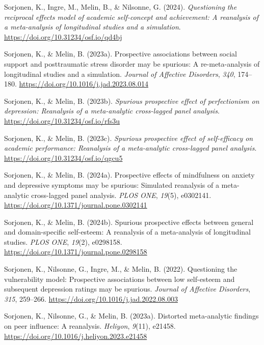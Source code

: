 \documentclass[
  man,floatsintext]{apa6}
\newlength{\cslhangindent}
\newenvironment{CSLReferences}[2] %
 {\begin{list}{}{%
  \setlength{\itemindent}{0pt}
  \setlength{\leftmargin}{0pt}
  \setlength{\parsep}{0pt}
  \ifodd #1
   \setlength{\leftmargin}{\cslhangindent}
   \setlength{\itemindent}{-1\cslhangindent}
  \fi
  \setlength{\itemsep}{#2\baselineskip}}}
 {\end{list}}
\begin{document}
\begin{CSLReferences}{1}{0}
Sorjonen, K., Ingre, M., Melin, B., \& Nilsonne, G. (2024). \emph{Questioning the reciprocal effects model of academic self-concept and achievement: {A} reanalysis of a meta-analysis of longitudinal studies and a simulation}. \url{https://doi.org/10.31234/osf.io/qd4bj}

Sorjonen, K., \& Melin, B. (2023a). Prospective associations between social support and posttraumatic stress disorder may be spurious: {A} re-meta-analysis of longitudinal studies and a simulation. \emph{Journal of Affective Disorders}, \emph{340}, 174--180. \url{https://doi.org/10.1016/j.jad.2023.08.014}

Sorjonen, K., \& Melin, B. (2023b). \emph{Spurious prospective effect of perfectionism on depression: {Reanalysis} of a meta-analytic cross-lagged panel analysis}. \url{https://doi.org/10.31234/osf.io/rfs3u}

Sorjonen, K., \& Melin, B. (2023c). \emph{Spurious prospective effect of self-efficacy on academic performance: {Reanalysis} of a meta-analytic cross-lagged panel analysis}. \url{https://doi.org/10.31234/osf.io/qgcu5}

Sorjonen, K., \& Melin, B. (2024a). Prospective effects of mindfulness on anxiety and depressive symptoms may be spurious: {Simulated} reanalysis of a meta-analytic cross-lagged panel analysis. \emph{PLOS ONE}, \emph{19}(5), e0302141. \url{https://doi.org/10.1371/journal.pone.0302141}

Sorjonen, K., \& Melin, B. (2024b). Spurious prospective effects between general and domain-specific self-esteem: {A} reanalysis of a meta-analysis of longitudinal studies. \emph{PLOS ONE}, \emph{19}(2), e0298158. \url{https://doi.org/10.1371/journal.pone.0298158}

Sorjonen, K., Nilsonne, G., Ingre, M., \& Melin, B. (2022). Questioning the vulnerability model: {Prospective} associations between low self-esteem and subsequent depression ratings may be spurious. \emph{Journal of Affective Disorders}, \emph{315}, 259--266. \url{https://doi.org/10.1016/j.jad.2022.08.003}

Sorjonen, K., Nilsonne, G., \& Melin, B. (2023a). Distorted meta-analytic findings on peer influence: {A} reanalysis. \emph{Heliyon}, \emph{9}(11), e21458. \url{https://doi.org/10.1016/j.heliyon.2023.e21458}


\end{CSLReferences}
\end{document}
